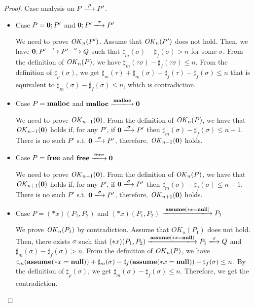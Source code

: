 \begin{proof}
Case analysis on \(P \xlongrightarrow{\rho} P'\).

\begin{itemize}

\item Case $P = \mathbf{0};P'$ and \(\TSKIP;P' \xlongrightarrow{\tau} P'\)

  We need to prove \(\mathit{OK}_n(P')\).  Assume that \(\mathit{OK}_n(P')\) does not
  hold. Then, we have \(\TSKIP;P' \xlongrightarrow{\tau} P'
  \xlongrightarrow{\sigma} Q\) such that \(\sharp_{m}(\sigma) -
  \sharp_{f}(\sigma) > n\) for some \(\sigma\).  From the definition
  of \(\mathit{OK}_n(P)\), we have \(\sharp_m(\tau\sigma) - \sharp_f(\tau
  \sigma) \le n \).  From the definition of \(\sharp_\rho(\sigma)\),
  we get \(\sharp_m(\tau) + \sharp_m(\sigma) - \sharp_f(\tau) -
  \sharp_f(\sigma) \le n\) that is equivalent to \(\sharp_m(\sigma) -
  \sharp_f(\sigma) \le n\), which is contradiction.

\item Case $P = \mathbf{malloc}$ and \(\Malloc \xlongrightarrow{\Malloc} \TSKIP\)

  We need to prove \(\mathit{OK}_{n-1}(\mathbf{0})\).  From the definition of
  \(\mathit{OK}_n(P)\), we have that \(\mathit{OK}_{n-1}(\mathbf{0})\) holds if, for any
  \(P'\), if \(\TSKIP \xlongrightarrow{\sigma} P'\) then
  \(\sharp_m(\sigma) - \sharp_f(\sigma) \le n - 1\). There is no such \(P'\) s.t. \(\TSKIP
  \xlongrightarrow{\sigma} P'\), therefore, \(\mathit{OK}_{n-1}(\mathbf{0})\) holds.

\item Case $P = \mathbf{free}$ and \(\Free \xlongrightarrow{\Free} \TSKIP\)

    We need to prove \(\mathit{OK}_{n+1}(\mathbf{0})\).  From the definition of
    \(\mathit{OK}_n(P)\), we have that \(\mathit{OK}_{n+1}(\mathbf{0})\) holds if, for any
    \(P'\), if \(\TSKIP \xlongrightarrow{\sigma} P'\) then
    \(\sharp_m(\sigma) - \sharp_f(\sigma) \le n + 1\). There is no
    such \(P'\) s.t. \(\TSKIP \xlongrightarrow{\sigma} P'\),
    therefore, \(\mathit{OK}_{n+1}(\mathbf{0})\) holds.    

\item Case \( P = (*x)(P_1,P_2) \) and \( (*x)(P_1,P_2) \) \(\xlongrightarrow{\sassx} P_1\)

  We prove \(\mathit{OK}_n(P_1)\) by contradiction. Assume that
  \(OK_{n}(P_1)\) does not hold.  Then, there exists \(\sigma\) such
  that \( (*x)(P_1,P_2) \xlongrightarrow{\sassx} P_{1}
  \xlongrightarrow{\sigma} Q\) and \(\sharp_{m}(\sigma) -
  \sharp_{f}(\sigma) > n\).  From the definition of \(\mathit{OK}_n(P)\), we
  have \(\sharp_m(\mathbf{assume}(*x = \mathbf{null})) + \sharp_m(\sigma) -\sharp_f(\mathbf{assume}(*x = \mathbf{null}))
  -\sharp_f(\sigma) \le n\).  By the definition of
  \(\sharp_\rho(\sigma)\), we get \(\sharp_m(\sigma) -\sharp_f(\sigma)
  \le n\). Therefore, we get the contradiction.


\end{itemize}
\end{proof}
